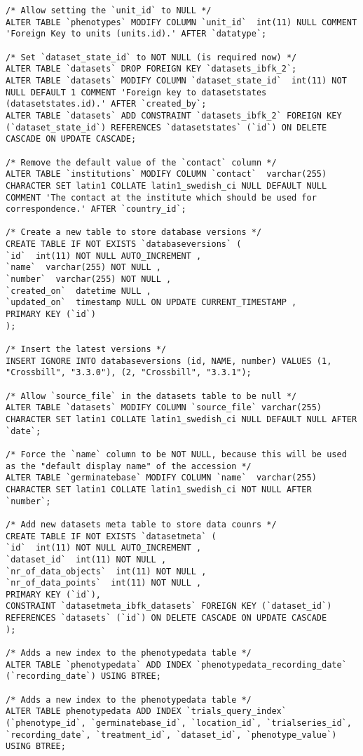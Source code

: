 \begin{itemize}
\begin{lstlisting}[style=SQL]
/* Allow setting the `unit_id` to NULL */
ALTER TABLE `phenotypes` MODIFY COLUMN `unit_id`  int(11) NULL COMMENT 'Foreign Key to units (units.id).' AFTER `datatype`;

/* Set `dataset_state_id` to NOT NULL (is required now) */
ALTER TABLE `datasets` DROP FOREIGN KEY `datasets_ibfk_2`;
ALTER TABLE `datasets` MODIFY COLUMN `dataset_state_id`  int(11) NOT NULL DEFAULT 1 COMMENT 'Foreign key to datasetstates (datasetstates.id).' AFTER `created_by`;
ALTER TABLE `datasets` ADD CONSTRAINT `datasets_ibfk_2` FOREIGN KEY (`dataset_state_id`) REFERENCES `datasetstates` (`id`) ON DELETE CASCADE ON UPDATE CASCADE;

/* Remove the default value of the `contact` column */
ALTER TABLE `institutions` MODIFY COLUMN `contact`  varchar(255) CHARACTER SET latin1 COLLATE latin1_swedish_ci NULL DEFAULT NULL COMMENT 'The contact at the institute which should be used for correspondence.' AFTER `country_id`;

/* Create a new table to store database versions */
CREATE TABLE IF NOT EXISTS `databaseversions` (
`id`  int(11) NOT NULL AUTO_INCREMENT ,
`name`  varchar(255) NOT NULL ,
`number`  varchar(255) NOT NULL ,
`created_on`  datetime NULL ,
`updated_on`  timestamp NULL ON UPDATE CURRENT_TIMESTAMP ,
PRIMARY KEY (`id`)
);

/* Insert the latest versions */
INSERT IGNORE INTO databaseversions (id, NAME, number) VALUES (1, "Crossbill", "3.3.0"), (2, "Crossbill", "3.3.1");

/* Allow `source_file` in the datasets table to be null */
ALTER TABLE `datasets` MODIFY COLUMN `source_file` varchar(255) CHARACTER SET latin1 COLLATE latin1_swedish_ci NULL DEFAULT NULL AFTER `date`;

/* Force the `name` column to be NOT NULL, because this will be used as the "default display name" of the accession */
ALTER TABLE `germinatebase` MODIFY COLUMN `name`  varchar(255) CHARACTER SET latin1 COLLATE latin1_swedish_ci NOT NULL AFTER `number`;

/* Add new datasets meta table to store data counrs */
CREATE TABLE IF NOT EXISTS `datasetmeta` (
`id`  int(11) NOT NULL AUTO_INCREMENT ,
`dataset_id`  int(11) NOT NULL ,
`nr_of_data_objects`  int(11) NOT NULL ,
`nr_of_data_points`  int(11) NOT NULL ,
PRIMARY KEY (`id`),
CONSTRAINT `datasetmeta_ibfk_datasets` FOREIGN KEY (`dataset_id`) REFERENCES `datasets` (`id`) ON DELETE CASCADE ON UPDATE CASCADE
);

/* Adds a new index to the phenotypedata table */
ALTER TABLE `phenotypedata` ADD INDEX `phenotypedata_recording_date` (`recording_date`) USING BTREE;

/* Adds a new index to the phenotypedata table */
ALTER TABLE phenotypedata ADD INDEX `trials_query_index` (`phenotype_id`, `germinatebase_id`, `location_id`, `trialseries_id`, `recording_date`, `treatment_id`, `dataset_id`, `phenotype_value`) USING BTREE;
	\end{lstlisting}
\end{itemize}